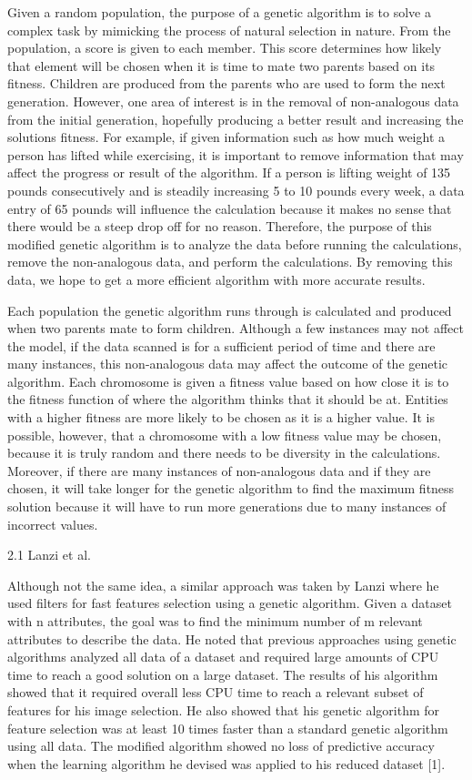 \documentclass[conference]{IEEEtran}
\begin{document}
\large Given a random population, the purpose of a genetic algorithm is to solve a complex task by mimicking the process of natural selection in nature. From the population, a score is given to each member. This score determines how likely that element will be chosen when it is time to mate two parents based on its fitness. Children are produced from the parents who are used to form the next generation. However, one area of interest is in the removal of non-analogous data from the initial generation, hopefully producing a better result and increasing the solutions fitness. For example, if given information such as how much weight a person has lifted while exercising, it is important to remove information that may affect the progress or result of the algorithm. If a person is lifting weight of 135 pounds consecutively and is steadily increasing 5 to 10 pounds every week, a data entry of 65 pounds will influence the calculation because it makes no sense that there would be a steep drop off for no reason. Therefore, the purpose of this modified genetic algorithm is to analyze the data before running the calculations, remove the non-analogous data, and perform the calculations. By removing this data, we hope to get a more efficient algorithm with more accurate results. 

\large Each population the genetic algorithm runs through is calculated and produced when two parents mate to form children. Although a few instances may not affect the model, if the data scanned is for a sufficient period of time and there are many instances, this non-analogous data may affect the outcome of the genetic algorithm. Each chromosome is given a fitness value based on how close it is to the fitness function of where the algorithm thinks that it should be at. Entities with a higher fitness are more likely to be chosen as it is a higher value. It is possible, however, that a chromosome with a low fitness value may be chosen, because it is truly random and there needs to be diversity in the calculations. Moreover, if there are many instances of non-analogous data and if they are chosen, it will take longer for the genetic algorithm to find the maximum fitness solution because it will have to run more generations due to many instances of incorrect values.  


2.1 Lanzi et al.


\large Although not the same idea, a similar approach was taken by Lanzi where he used filters for fast features selection using a genetic algorithm. Given a dataset with n attributes, the goal was to find the minimum number of m relevant attributes to describe the data. He noted that previous approaches using genetic algorithms analyzed all data of a dataset and required large amounts of CPU time to reach a good solution on a large dataset. The results of his algorithm showed that it required overall less CPU time to reach a relevant subset of features for his image selection. He also showed that his genetic algorithm for feature selection was at least 10 times faster than a standard genetic algorithm using all data. The modified algorithm showed no loss of predictive accuracy when the learning algorithm he devised was applied to his reduced dataset [1]. 
\end{document}
